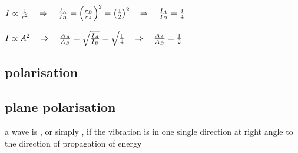 
\begin{soln}

{
	\centering
	
	$ I \propto \frac{1}{r^2} \quad \Rightarrow \quad \frac{I_A}{I_B} = \left(\frac{r_B}{r_A}\right)^2 = \left(\frac{1}{2}\right)^2 \quad \Rightarrow \quad \frac{I_A}{I_B} = \frac{1}{4} $
	
	\vspace*{0.4em} $ I \propto A^2 \quad \Rightarrow \quad \frac{A_A}{A_B} = \sqrt{\frac{I_A}{I_B}} = \sqrt{\frac{1}{4}} \quad \Rightarrow \quad \frac{A_A}{A_B} = \frac{1}{2} $
	
}

\end{soln}




\subsection{polarisation}

\subsection{plane polarisation}

\begin{ilight}
	a wave is , or simply , if the vibration is in one single direction at right angle to the direction of propagation of energy
\end{ilight}

